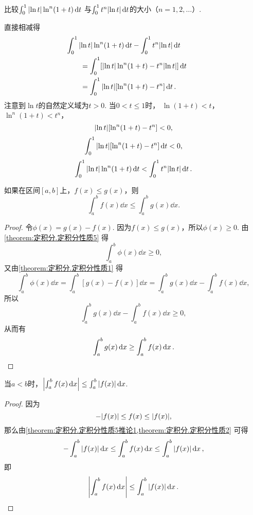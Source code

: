 \begin{example}
比较\(\int_0^1 \abs{\ln t} \ln^n(1+t) \dd{t}\)
与\(\int_0^1 t^n \abs{\ln t} \dd{t}\)的大小（\(n=1,2,\dotsc\)）.
\begin{solution}
直接相减得
\begin{align*}
	&\hspace{-20pt}
	\int_0^1 \abs{\ln t} \ln^n(1+t) \dd{t} - \int_0^1 t^n \abs{\ln t} \dd{t} \\
	&= \int_0^1 [\abs{\ln t} \ln^n(1+t) - t^n \abs{\ln t}] \dd{t} \\
	&= \int_0^1 \abs{\ln t} [\ln^n(1+t) - t^n] \dd{t}.
\end{align*}
注意到\(\ln t\)的自然定义域为\(t > 0\).
当\(0 < t \leq 1\)时，
\(\ln(1+t) < t\)，
\(\ln^n(1+t) < t^n\)，
\[
	\abs{\ln t} [\ln^n(1+t) - t^n] < 0,
\]\[
	\int_0^1 \abs{\ln t} [\ln^n(1+t) - t^n] \dd{t} < 0,
\]\[
	\int_0^1 \abs{\ln t} \ln^n(1+t) \dd{t} < \int_0^1 t^n \abs{\ln t} \dd{t}.
\]
\end{solution}
\end{example}

\begin{corollary}\label{theorem:定积分.定积分性质5推论1}
如果在区间\([a,b]\)上，\(f(x) \leq g(x)\)，则\[
	\int_a^b f(x) \dd{x} \leq \int_a^b g(x) \dd{x}.
\]
\begin{proof}
令\(\phi(x) = g(x) - f(x)\).
因为\(f(x) \leq g(x)\)，所以\(\phi(x) \geq 0\).
由\cref{theorem:定积分.定积分性质5} 得\[
	\int_a^b \phi(x) \dd{x} \geq 0,
\]
又由\cref{theorem:定积分.定积分性质1} 得\[
	\int_a^b \phi(x) \dd{x}
	= \int_a^b [g(x) - f(x)] \dd{x}
	= \int_a^b g(x) \dd{x} - \int_a^b f(x) \dd{x},
\]
所以\[
	\int_a^b g(x) \dd{x} - \int_a^b f(x) \dd{x} \geq 0,
\]
从而有\[
	\int_a^b g(x) \dd{x} \geq \int_a^b f(x) \dd{x}.
	\qedhere
\]
\end{proof}
\end{corollary}

\begin{corollary}\label{theorem:定积分.定积分性质5推论2}
当\(a<b\)时，\(\abs{\int_a^b f(x) \dd{x}} \leq \int_a^b \abs{f(x)} \dd{x}\).
\begin{proof}
因为\[
	-\abs{f(x)} \leq f(x) \leq \abs{f(x)},
\]
那么由\cref{theorem:定积分.定积分性质5推论1,theorem:定积分.定积分性质2} 可得\[
	-\int_a^b \abs{f(x)} \dd{x}
	\leq
	\int_a^b f(x) \dd{x}
	\leq
	\int_a^b \abs{f(x)} \dd{x},
\]
即\[
	\abs{\int_a^b f(x) \dd{x}} \leq \int_a^b \abs{f(x)} \dd{x}.
	\qedhere
\]
\end{proof}
\end{corollary}

